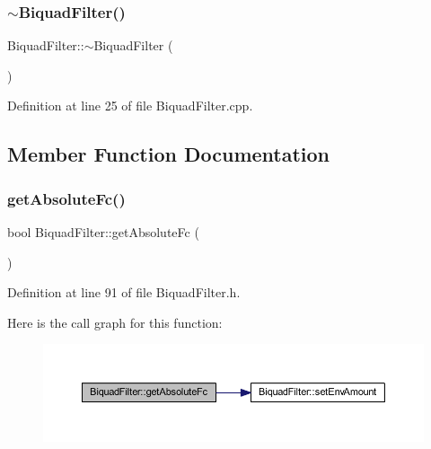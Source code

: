 \subsubsection{\texorpdfstring{$\sim$\+Biquad\+Filter()}{~BiquadFilter()}}
{\footnotesize\ttfamily Biquad\+Filter\+::$\sim$\+Biquad\+Filter (\begin{DoxyParamCaption}{ }\end{DoxyParamCaption})}



Definition at line 25 of file Biquad\+Filter.\+cpp.



\subsection{Member Function Documentation}
\mbox{\label{class_biquad_filter_a4e2b1fd4bb0af7f4bea4709b1bf51792}} 
\subsubsection{\texorpdfstring{get\+Absolute\+Fc()}{getAbsoluteFc()}}
{\footnotesize\ttfamily bool Biquad\+Filter\+::get\+Absolute\+Fc (\begin{DoxyParamCaption}{ }\end{DoxyParamCaption})\hspace{0.3cm}{\ttfamily [inline]}}



Definition at line 91 of file Biquad\+Filter.\+h.

Here is the call graph for this function\+:
\nopagebreak
\begin{figure}[H]
\begin{center}
\leavevmode
\includegraphics[width=350pt]{class_biquad_filter_a4e2b1fd4bb0af7f4bea4709b1bf51792_cgraph}
\end{center}
\end{figure}
\mbox{\label{class_biquad_filter_a00fd6c36ca50169705ad5c00560341d9}} 
